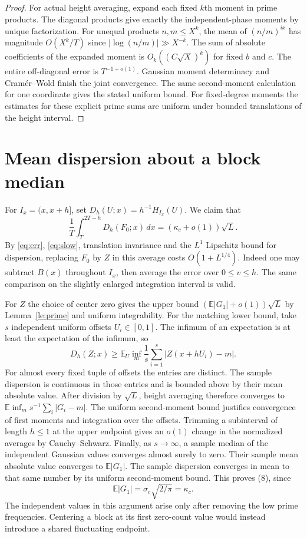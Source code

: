 \documentclass[11pt]{article}
\newcommand{\E}{\mathbb E}
\begin{document}
\begin{proof}
For actual height averaging, expand each fixed $k$th moment in prime products. The diagonal products give exactly the independent-phase moments by unique factorization. For unequal products $n,m\le X^k$, the mean of $(n/m)^{ix}$ has magnitude $O(X^k/T)$ since $|\log(n/m)|\gg X^{-k}$. The sum of absolute coefficients of the expanded moment is $O_k((C\sqrt X)^k)$ for fixed $b$ and $c$. The entire off-diagonal error is $T^{-1+o(1)}$. Gaussian moment determinacy and Cram\'er--Wold finish the joint convergence. The same second-moment calculation for one coordinate gives the stated uniform bound. For fixed-degree moments the estimates for these explicit prime sums are uniform under bounded translations of the height interval.
\end{proof}

\section{Mean dispersion about a block median}
For $I_x=(x,x+h]$, set $D_h(U;x)=h^{-1}H_{I_x}(U)$. We claim that
\[
 \frac1T\int_T^{2T-h}D_h(F_0;x)\,dx
       =(\kappa_c+o(1))\sqrt L .                                    \tag{8}
\]
By \eqref{eq:err}, \eqref{eq:slow}, translation invariance and the $L^1$ Lipschitz bound for dispersion, replacing $F_0$ by $Z$ in this average costs $O(1+L^{1/4})$. Indeed one may subtract $B(x)$ throughout $I_x$, then average the error over $0\le v\le h$. The same comparison on the slightly enlarged integration interval is valid.

For $Z$ the choice of center zero gives the upper bound $(\E|G_1|+o(1))\sqrt L$ by Lemma~\ref{le:prime} and uniform integrability. For the matching lower bound, take $s$ independent uniform offsets $U_i\in[0,1]$. The infimum of an expectation is at least the expectation of the infimum, so
\[
 D_h(Z;x)\ge \E_U\inf_m\frac1s\sum_{i=1}^s |Z(x+hU_i)-m|.
\]
For almost every fixed tuple of offsets the entries are distinct. The sample dispersion is continuous in those entries and is bounded above by their mean absolute value. After division by $\sqrt L$, height averaging therefore converges to $\E\inf_m s^{-1}\sum_i|G_i-m|$. The uniform second-moment bound justifies convergence of first moments and integration over the offsets. Trimming a subinterval of length $h\le1$ at the upper endpoint gives an $o(1)$ change in the normalized averages by Cauchy--Schwarz. Finally, as $s\to\infty$, a sample median of the independent Gaussian values converges almost surely to zero. Their sample mean absolute value converges to $\E|G_1|$. The sample dispersion converges in mean to that same number by its uniform second-moment bound. This proves (8), since
\[
 \E|G_1|=\sigma_c\sqrt{2/\pi}=\kappa_c.
\]
The independent values in this argument arise only after removing the low prime frequencies. Centering a block at its first zero-count value would instead introduce a shared fluctuating endpoint.
\end{document}
